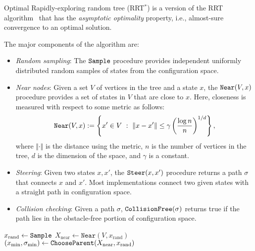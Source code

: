 Optimal Rapidly-exploring random tree (RRT$^*$) \cite{karaman.frazzoli.ijrr11} is a version of the RRT algorithm~\cite{lavalle.kuffner.ijrr01} that has the \emph{asymptotic optimality} property, i.e., almost-sure convergence to an optimal solution.

The major components of the algorithm are:
\begin{itemize}
\item {\it Random sampling}:
%
The ${\tt Sample}$ procedure provides independent uniformly distributed random samples of states from the configuration space.

\item {\it Near nodes}:
%
Given a set $V$ of vertices in the tree and a state $x$, the ${\tt
Near}(V, x)$ procedure provides a set of states in $V$ that are close to
$x$. Here, closeness is measured with respect to some metric as
follows:
$$
{\tt Near}(V, x) := \left\{ x' \in V \,\,:\,\, \Vert x - x' \Vert \le \gamma
\left(\frac{\log n}{n}\right)^{1/d} \right\},
$$
where $\Vert \cdot \Vert$ is the distance using the metric, $n$ is the number of vertices in the tree, $d$ is the dimension of the space, and $\gamma$ is a constant.
 
\item {\it Steering}:
%
Given two states $x, x'$, the ${\tt Steer}(x,x')$ procedure returns a path $\sigma$ that connects $x$ and $x'$. Most implementations connect two given states with a straight path in configuration space.

\item {\it Collision checking}:
%
Given a path $\sigma$, ${\tt CollisionFree}(\sigma)$ returns true if the path lies in the obstacle-free portion of configuration space.

\end{itemize}

\begin{center}
\begin{algorithm}
 { \label{line:iteration_start_orig}
$x_\mathrm{rand} \leftarrow {\tt Sample}$\; \label{line:rrtstar:sample}
$X_\mathrm{near} \leftarrow \mathtt{Near}(V ,x_\mathrm{rand})$\; \label{line:rrtstar:compute_near_orig}
$(x_\mathrm{min},\sigma_\mathrm{min}) \leftarrow {\tt ChooseParent}(X_\mathrm{near}, x_\mathrm{rand})$\; \label{line:rrtstar:call_find_min_cost_parent}
}
\;
\caption{${\tt RRT}^* ((V,E), N)$}
\label{algorithm:rrtstar_orig}
\end{algorithm}
\end{center}

